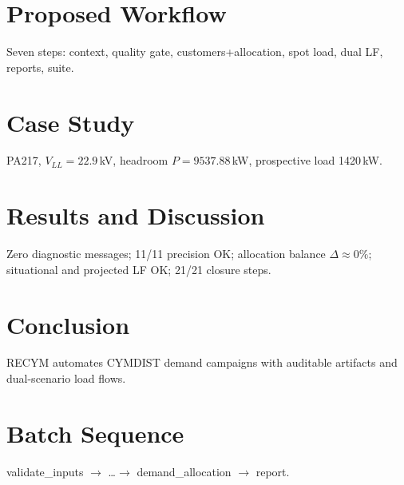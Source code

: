 \documentclass[journal]{IEEEtran}
\begin{document}
\section{Proposed Workflow}
Seven steps: context, quality gate, customers+allocation, spot load, dual LF, reports, suite.

\section{Case Study}
PA217, $V_{LL}=22.9$\,kV, headroom $P=9537.88$\,kW, prospective load 1420\,kW.

\section{Results and Discussion}
Zero diagnostic messages; 11/11 precision OK; allocation balance $\Delta\approx0\%$; situational and projected LF OK; 21/21 closure steps.

\section{Conclusion}
RECYM automates CYMDIST demand campaigns with auditable artifacts and dual-scenario load flows.

\appendices
\section{Batch Sequence}
validate\_inputs $\rightarrow$ \ldots $\rightarrow$ demand\_allocation $\rightarrow$ report.



\end{document}
